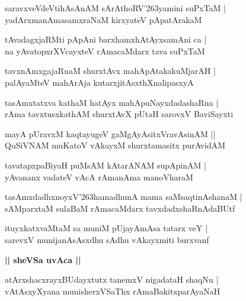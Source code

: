 \documentclass[twoside,12pt,openright]{book}
\def\S{\char'263}
\newcounter{shloka}[chapter]
\def\uvaca#1{\centerline{{\large\textbf{#1}}}}
\begin{document}
\begin{shloka}%
saravxveVdeVtihAsAnAM sArAthoRV\S yamini suPxTaM |\\
yadArxmanAmasamxraNaM kirxyateV pApatArakaM 
\end{shloka}

\begin{shloka}%
tAvadagxjaRMti pApAni barxhamxhAtAyxsamAni ca |\\
na yAvatopxrXVcayxteV rAmacaMdarx tava suPxTaM 
\end{shloka}

\begin{shloka}%
tavxnAmxgajaRnaM shurxtAvx mahApAtakakuMjarAH |\\
palAyaMteV mahArAja kutarxjitAsxthXnalipasxyA 
\end{shloka}

\begin{shloka}%
tasAmxtatxva kathaM hatAyx mahApuNayxdadashaRna |\\
rAma tavxtusxkathAM shurxtAvX pUtaH sarovxV BaviSayxti 
\end{shloka}

\begin{shloka}%
mayA pUravxM kaqtayugeV gaMgAyAsitxVravAsinAM ||\\
QuSiVNAM muKatoV vAkayxM shurxtamasitx purAvidAM 

\end{shloka}

\begin{shloka}%
tavatapxpaBiyaH puMsAM kAtarANAM supApinAM |\\
yAvananx vadateV vAcA rAmanAma manoVharaM 
\end{shloka}

\begin{shloka}%
tasAmxdadhxnoyxV\S hamadhunA mama saMsaqtinAshanaM |\\
sAMparxtaM sulaBaM rAmacaMdarx tavxdadxshaRnAdaBUtf 
\end{shloka}

\begin{shloka}%
ituyxkatxvaMtaM sa muniM pUjayAmAsa tatarx veY |\\
sarevxV munijanAsAsxdhu sAdhu vAkayxmiti burxvanf 
\end{shloka}

\uvaca{|| sheVSa uvAca ||}

\begin{shloka}%
atArxshacxrayxBUdayxtutx tanemxV nigadataH shaqNu |\\
vAtAsxyXyana munisherxVSaThx rAmaBakitxparAyaNaH
\end{shloka}
\end{document}
